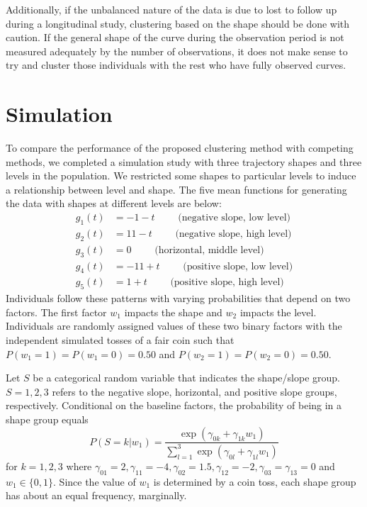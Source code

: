 \documentclass[12pt]{article}
\begin{document}
Additionally, if the unbalanced nature of the data is due to lost to follow up during a longitudinal study, clustering based on the shape should be done with caution. If the general shape of the curve during the observation period is not measured adequately by the number of observations, it does not make sense to try and cluster those individuals with the rest who have fully observed curves. 

\section{Simulation}
To compare the performance of the proposed clustering method with competing methods, we completed a simulation study with three trajectory shapes and three levels in the population. We restricted some shapes to particular levels to induce a relationship between level and shape. The five mean functions for generating the data with shapes at different levels are below:   
\begin{align*}
g_{1}(t) &= -1 - t \quad\quad\text{ (negative slope, low level)}\\
g_{2}(t) &= 11 - t\quad\quad\text{ (negative slope, high level)}\\
g_{3}(t) &= 0\quad\quad\text{ (horizontal, middle level)}\\
g_{4}(t) &= -11 + t\quad\quad\text{ (positive slope, low level)}\\
g_{5}(t) &= 1 + t\quad\quad\text{ (positive slope, high level)}
\end{align*} 
Individuals follow these patterns with varying probabilities that depend on two factors. The first factor $w_{1}$ impacts the shape and $w_{2}$ impacts the level. Individuals are randomly assigned values of these two binary factors with the independent simulated tosses of a fair coin such that $P(w_{1}=1) = P(w_{1}=0) = 0.50$ and $P(w_{2}=1) = P(w_{2}=0)=0.50$. 

Let $S$ be a categorical random variable that indicates the shape/slope group. $S=1,2,3$ refers to the negative slope, horizontal, and positive slope groups, respectively. Conditional on the baseline factors, the probability of being in a shape group equals
$$P(S=k |w_{1}) = \frac{\exp(\gamma_{0k}+\gamma_{1k}w_{1})}{\sum^{3}_{l=1} \exp(\gamma_{0l}+\gamma_{1l}w_{1})}$$
for $k=1,2,3$ where $\gamma_{01}=2,\gamma_{11} = -4,\gamma_{02}=1.5,\gamma_{12}=-2,\gamma_{03}=\gamma_{13} = 0$ and $w_{1}\in\{0,1\}$. Since the value of $w_{1}$ is determined by a coin toss, each shape group has about an equal frequency, marginally. 
\end{document}
